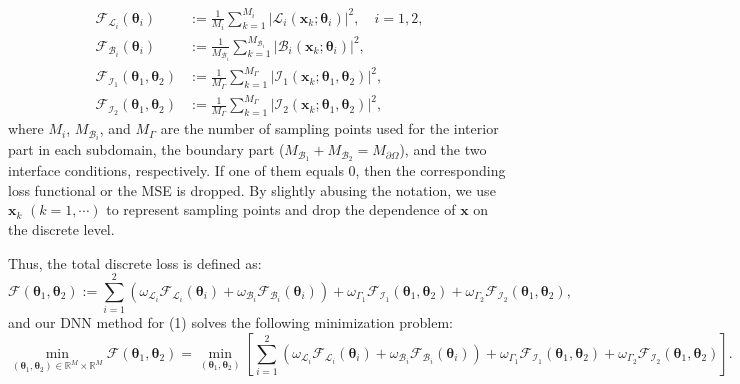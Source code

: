 \documentclass{article}
\begin{document}
\begin{equation}
    \begin{aligned}
\mathcal{F}_{\mathcal{L}_i}(\boldsymbol{\theta}_i) &:= \frac{1}{M_{i}} \sum_{k=1}^{M_{i}} |\mathcal{L}_i(\boldsymbol{x}_k; \boldsymbol{\theta}_i)|^2, \quad i=1,2, \\
\mathcal{F}_{\mathcal{B}_i}(\boldsymbol{\theta}_i) &:= \frac{1}{M_{\mathcal{B}_i}} \sum_{k=1}^{M_{\mathcal{B}_i}} |\mathcal{B}_i(\boldsymbol{x}_k; \boldsymbol{\theta}_i)|^2, \\
\mathcal{F}_{\mathcal{I}_1}(\boldsymbol{\theta}_1, \boldsymbol{\theta}_2) &:= \frac{1}{M_{\Gamma}} \sum_{k=1}^{M_{\Gamma}} |\mathcal{I}_1(\boldsymbol{x}_k; \boldsymbol{\theta}_1, \boldsymbol{\theta}_2)|^2, \\
\mathcal{F}_{\mathcal{I}_2}(\boldsymbol{\theta}_1, \boldsymbol{\theta}_2) &:= \frac{1}{M_{\Gamma}} \sum_{k=1}^{M_{\Gamma}} |\mathcal{I}_2(\boldsymbol{x}_k; \boldsymbol{\theta}_1, \boldsymbol{\theta}_2)|^2,
\end{aligned}
\end{equation}
where $M_{i}$, $M_{\mathcal{B}_i}$, and $M_{\Gamma}$ are the number of sampling points used for the interior part in each subdomain, the boundary part ($M_{\mathcal{B}_1} + M_{\mathcal{B}_2} = M_{\partial \Omega}$), and the two interface conditions, respectively. If one of them equals 0, then the corresponding loss functional or the MSE is dropped. By slightly abusing the notation, we use $\boldsymbol{x}_k$ $(k = 1, \cdots)$ to represent sampling points and drop the dependence of $\boldsymbol{x}$ on the discrete level.

Thus, the total discrete loss is defined as:
$$
\mathcal{F}(\boldsymbol{\theta}_1, \boldsymbol{\theta}_2) := \sum_{i=1}^{2} \left(\omega_{\mathcal{L}_i} \mathcal{F}_{\mathcal{L}_i}(\boldsymbol{\theta}_i) + \omega_{\mathcal{B}_i} \mathcal{F}_{\mathcal{B}_i}(\boldsymbol{\theta}_i)\right) + \omega_{\Gamma_1} \mathcal{F}_{\mathcal{I}_1}(\boldsymbol{\theta}_1, \boldsymbol{\theta}_2) + \omega_{\Gamma_2} \mathcal{F}_{\mathcal{I}_2}(\boldsymbol{\theta}_1, \boldsymbol{\theta}_2),
$$
and our DNN method for (1) solves the following minimization problem:
$$
\min_{(\boldsymbol{\theta}_1, \boldsymbol{\theta}_2) \in \mathbb{R}^M \times \mathbb{R}^M} \mathcal{F}(\boldsymbol{\theta}_1, \boldsymbol{\theta}_2) = \min_{(\boldsymbol{\theta}_1, \boldsymbol{\theta}_2)} \left[ \sum_{i=1}^{2} \left(\omega_{\mathcal{L}_i} \mathcal{F}_{\mathcal{L}_i}(\boldsymbol{\theta}_i) + \omega_{\mathcal{B}_i} \mathcal{F}_{\mathcal{B}_i}(\boldsymbol{\theta}_i)\right) + \omega_{\Gamma_1} \mathcal{F}_{\mathcal{I}_1}(\boldsymbol{\theta}_1, \boldsymbol{\theta}_2) + \omega_{\Gamma_2} \mathcal{F}_{\mathcal{I}_2}(\boldsymbol{\theta}_1, \boldsymbol{\theta}_2) \right].
$$
\end{document}
